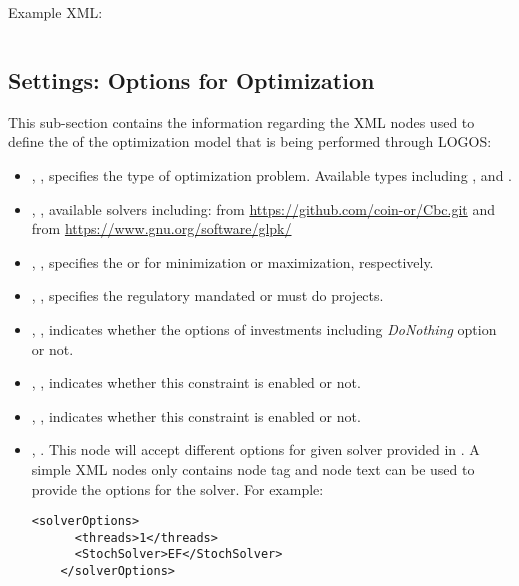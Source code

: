 Example XML:
\begin{lstlisting}[style=XML]

\end{lstlisting}


%
\subsection{Settings: Options for Optimization}
\label{subsec:Settings}

This sub-section contains the information regarding the XML nodes used to define the
 of the optimization model that is being performed through LOGOS:
\begin{itemize}
  \item {}, , specifies the type of
  optimization problem. Available types including ,
   and .
  \item {}, , available solvers including:
   from \url{https://github.com/coin-or/Cbc.git} and  from
  \url{https://www.gnu.org/software/glpk/}
  \item {}, , specifies the 
  or  for minimization or maximization, respectively.
  \item {}, ,
  specifies the regulatory mandated or must do projects.
  \item {}, , indicates whether the
  options of investments including \textit{DoNothing} option or not.
  \item {}, , indicates whether
  this constraint is enabled or not.
  \item {}, , indicates whether
  this constraint is enabled or not.
  \item {}, . This node will accept
  different options for given solver provided in . A simple XML nodes only contains
  node tag and node text can be used to provide the options for the solver. For example:
  \begin{lstlisting}[style=XML]
    <solverOptions>
      <threads>1</threads>
      <StochSolver>EF</StochSolver>
    </solverOptions>
  \end{lstlisting}
\end{itemize}

